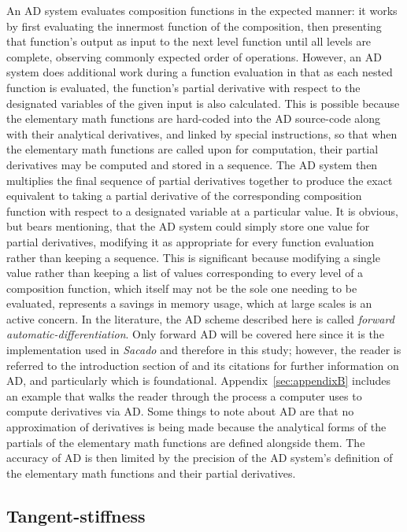 \documentclass[preprint,12pt]{elsarticle}
\begin{document}
An AD system evaluates composition functions in the expected manner: it works
by first evaluating the innermost function of the composition, then presenting
that function's output as input to the next level function until all levels are
complete, observing commonly expected order of operations. However, an AD
system does additional work during a function evaluation in that as each nested
function is evaluated, the function's partial derivative with respect to the
designated variables of the given input is also calculated.  This is possible
because the elementary math functions are hard-coded into the AD source-code
along with their analytical derivatives, and linked by special instructions, so
that when the elementary math functions are called upon for computation, their
partial derivatives may be computed and stored in a sequence. The AD system
then multiplies the final sequence of partial derivatives together to produce
the exact equivalent to taking a partial derivative of the corresponding
composition function with respect to a designated variable at a particular
value. It is obvious, but bears mentioning, that the AD system could simply
store one value for partial derivatives, modifying it as appropriate for every
function evaluation rather than keeping a sequence. This is significant because
modifying a single value rather than keeping a list of values corresponding to
every level of a composition function, which itself may not be the sole one
needing to be evaluated, represents a savings in memory usage, which at large
scales is an active concern. In the literature, the AD scheme described here is
called \emph{forward automatic-differentiation}. Only forward AD will be
covered here since it is the implementation used in \emph{Sacado} and therefore
in this study; however, the reader is referred to the introduction section of
\cite{ref-AD-methods} and its citations for further information on AD, and
particularly \cite{ref-on-AD} which is foundational.
Appendix~\ref{sec:appendixB} includes an example that walks the reader through
the process a computer uses to compute derivatives via AD.  Some things to note
about AD are that no approximation of derivatives is being made because the
analytical forms of the partials of the elementary math functions are defined
alongside them. The accuracy of AD is then limited by the precision of the AD
system's definition of the elementary math functions and their partial
derivatives.
 
\subsection{Tangent-stiffness} 
\end{document}
